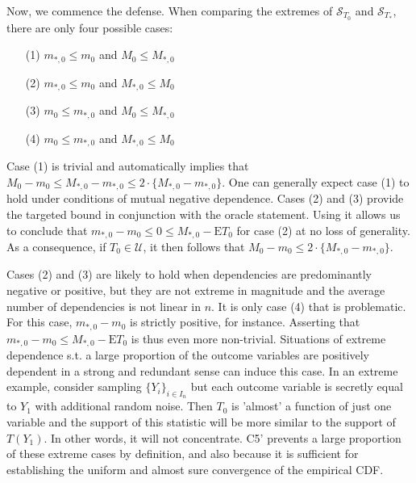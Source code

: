\documentclass[12pt]{amsart}
\theoremstyle{plain}%
\theoremstyle{definition}
\theoremstyle{remark}
\numberwithin{equation}{section}
\begin{document}
Now, we commence the defense. When comparing the extremes of $\mathcal{S}_{T_0}$ and $\mathcal{S}_{T_*}$, there are only four possible cases:
\begin{enumerate}
\item[(1)] $m_{*, 0} \leq m_0$ and $M_0 \leq M_{*, 0}$
\item[(2)] $m_{*, 0} \leq m_0$ and $M_{*, 0} \leq M_0$
\item[(3)] $m_0 \leq m_{*, 0}$ and $M_0 \leq M_{*, 0}$
\item[(4)] $m_0 \leq m_{*, 0}$ and $M_{*, 0} \leq M_{0}$
\end{enumerate}
Case (1) is trivial and automatically implies that $M_0 - m_0 \leq M_{*, 0} - m_{*, 0} \leq 2\cdot \{ M_{*, 0} - m_{*, 0} \}$. One can generally expect case (1) to hold under conditions of mutual negative dependence. Cases (2) and (3) provide the targeted bound in conjunction with the oracle statement. Using it allows us to conclude that $m_{*, 0} - m_0 \leq 0 \leq M_{*, 0} - \text{E}T_0$ for case (2) at no loss of generality. As a consequence, if $T_0 \in \mathcal{U}$, it then follows that $M_0 - m_0 \leq 2 \cdot \{ M_{*, 0} - m_{*, 0} \}$.

Cases (2) and (3) are likely to hold when dependencies are predominantly negative or positive, but they are not extreme in magnitude and the average number of dependencies is not linear in $n$. It is only case (4) that is problematic. For this case, $m_{*, 0}-m_0$ is strictly positive, for instance. Asserting that $m_{*, 0}-m_0 \leq M_{*, 0} - \text{E}T_0$ is thus even more non-trivial. Situations of extreme dependence s.t. a large proportion of the outcome variables are positively dependent in a strong and redundant sense can induce this case. In an extreme example, consider  sampling $\{ Y_i \}_{i \in I_n}$ but each outcome variable is secretly equal to $Y_1$ with additional random noise. Then $T_0$ is 'almost' a function of just one variable and the support of this statistic will be more similar to the support of $T(Y_1)$. In other words, it will not concentrate. C5' prevents a large proportion of these extreme cases by definition, and also because it is sufficient for establishing the uniform and almost sure convergence of the empirical CDF.
\end{document}

